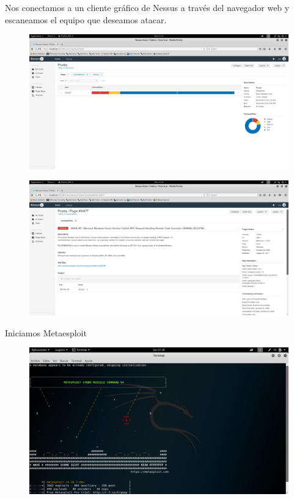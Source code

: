 \documentclass{beamer}
\begin{document}
\begin{frame}

Nos conectamos a un cliente gráfico de Nessus a través del navegador web y escaneamos el equipo que deseamos atacar.

\begin{figure}[h]
\centering
		\includegraphics[scale=0.25]{./img/Demo/Nessus2}
\end{figure}
\end{frame}

\begin{frame}
\begin{figure}[h]
\centering
		\includegraphics[scale=0.25]{./img/Demo/Nessus3}
\end{figure}
\end{frame}

\begin{frame}
	Iniciamos Metaesploit
	\begin{figure}[h]
\centering
		\includegraphics[scale=0.3]{./img/Demo/Metasploit1}
\end{figure}
\end{frame}
\end{document}
